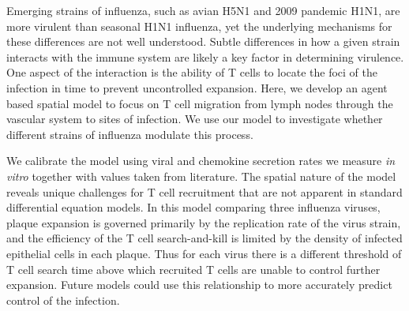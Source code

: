 \documentclass[preprint,10pt,numbers]{elsarticle}
\begin{document}


Emerging strains of influenza, such as avian H5N1 and 2009 pandemic H1N1, are more virulent than seasonal H1N1 influenza, yet the underlying mechanisms for these differences are not well understood.  Subtle differences in how a given strain interacts with the immune system are likely a key factor in determining virulence.  One aspect of the interaction is the ability of T cells to locate the foci of the infection in time to prevent uncontrolled expansion.  Here, we develop an agent based spatial model to focus on T cell migration from lymph nodes through the vascular system to sites of infection. We use our model to investigate whether different strains of influenza modulate this process.

We calibrate the model using viral and chemokine secretion rates we measure \textit{in vitro} together with values taken from literature.  The spatial nature of the model reveals unique challenges for T cell recruitment that are not apparent in standard differential equation models.  %
In this model comparing three influenza viruses, plaque expansion is governed primarily by the replication rate of the virus strain, and the efficiency of the T cell search-and-kill is limited by the density of infected epithelial cells in each plaque.  Thus for each virus there is a different threshold of T cell search time above which recruited T cells are unable to control further expansion.  Future models could use this relationship to more accurately predict control of the infection.

\end{document}
